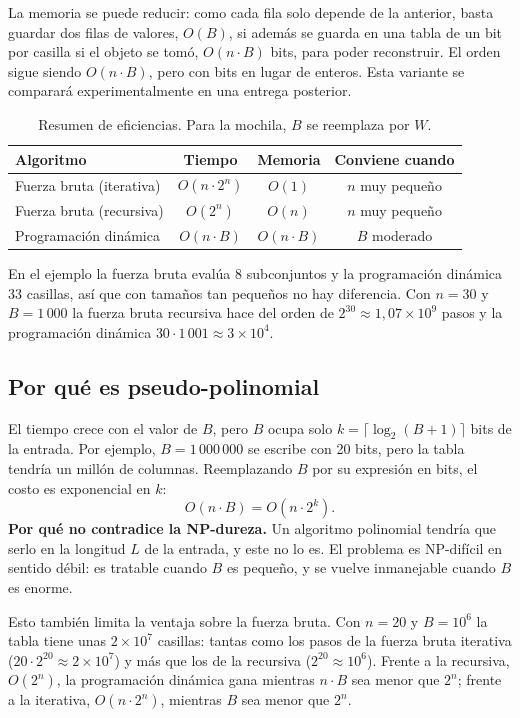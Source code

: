 \documentclass[11pt,a4paper]{article}
\theoremstyle{plano}
\begin{document}
La memoria se puede reducir: como cada fila solo depende de la anterior, basta guardar dos filas de valores, $O(B)$, si además se guarda en una tabla de un bit por casilla si el objeto se tomó, $O(n\cdot B)$ bits, para poder reconstruir. El orden sigue siendo $O(n\cdot B)$, pero con bits en lugar de enteros. Esta variante se comparará experimentalmente en una entrega posterior.

\begin{table}[h]
\centering\small
\begin{tabular}{lccc}
\toprule
Algoritmo & Tiempo & Memoria & Conviene cuando \\
\midrule
Fuerza bruta (iterativa) & $O(n\cdot 2^n)$ & $O(1)$ & $n$ muy pequeño \\
Fuerza bruta (recursiva) & $O(2^n)$ & $O(n)$ & $n$ muy pequeño \\
Programación dinámica & $O(n\cdot B)$ & $O(n\cdot B)$ & $B$ moderado \\
\bottomrule
\end{tabular}
\caption{Resumen de eficiencias. Para la mochila, $B$ se reemplaza por $W$.}
\end{table}

En el ejemplo la fuerza bruta evalúa $8$ subconjuntos y la programación dinámica $33$ casillas, así que con tamaños tan pequeños no hay diferencia. Con $n=30$ y $B=1\,000$ la fuerza bruta recursiva hace del orden de $2^{30}\approx 1{,}07\times 10^{9}$ pasos y la programación dinámica $30\cdot 1\,001\approx 3\times 10^{4}$.

\subsection{Por qué es pseudo-polinomial}

El tiempo crece con el valor de $B$, pero $B$ ocupa solo $k=\lceil\log_2(B+1)\rceil$ bits de la entrada. Por ejemplo, $B=1\,000\,000$ se escribe con 20 bits, pero la tabla tendría un millón de columnas. Reemplazando $B$ por su expresión en bits, el costo es exponencial en $k$:
\begin{equation}
  O(n\cdot B)=O(n\cdot 2^k).
\end{equation}
\textbf{Por qué no contradice la NP-dureza.} Un algoritmo polinomial tendría que serlo en la longitud $L$ de la entrada, y este no lo es. El problema es NP-difícil en sentido débil: es tratable cuando $B$ es pequeño, y se vuelve inmanejable cuando $B$ es enorme.

Esto también limita la ventaja sobre la fuerza bruta. Con $n=20$ y $B=10^{6}$ la tabla tiene unas $2\times 10^{7}$ casillas: tantas como los pasos de la fuerza bruta iterativa ($20\cdot 2^{20}\approx 2\times 10^{7}$) y más que los de la recursiva ($2^{20}\approx 10^{6}$). Frente a la recursiva, $O(2^n)$, la programación dinámica gana mientras $n\cdot B$ sea menor que $2^n$; frente a la iterativa, $O(n\cdot 2^n)$, mientras $B$ sea menor que $2^n$.
\end{document}
